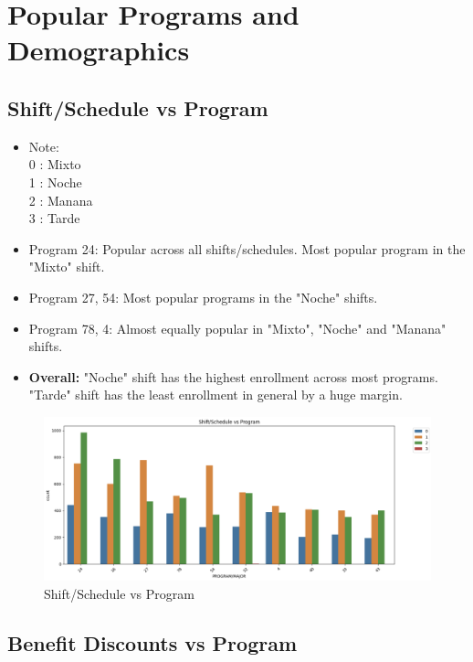 \documentclass[12pt]{article}
\begin{document}
\section{Popular Programs and Demographics}

\subsection{Shift/Schedule vs Program}

\begin{itemize}
    \item Note:\\
    0 : Mixto\\
    1 : Noche\\
    2 : Manana\\
    3 : Tarde
    
    \item Program 24: Popular across all shifts/schedules. Most popular program in the "Mixto" shift.

    \item Program 27, 54: Most popular programs in the "Noche" shifts.

    \item Program 78, 4: Almost equally popular in "Mixto", "Noche" and "Manana" shifts.

    \item \textbf{Overall: }"Noche" shift has the highest enrollment across most programs. "Tarde" shift has the least enrollment in general by a huge margin.
\end{itemize}

\begin{figure}[H]
    \centering
    \includegraphics[width=1\linewidth]{shift:schedule.png}
    \caption{Shift/Schedule vs Program}
\end{figure}

\subsection{Benefit Discounts vs Program}
\end{document}
